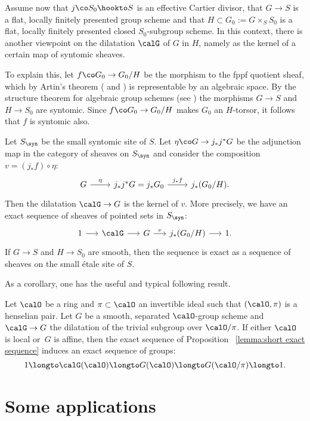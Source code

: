 \documentclass[10pt]{alggeom}
\theoremstyle{definition}
\numberwithin{equation}{section}
\begin{document}
Assume now that $j\co S_0\hookto S$ is an effective Cartier divisor,
that $G\to S$ is a flat, locally finitely presented group scheme
and that $H\subset G_0:=G\times_SS_0$ is a flat, locally finitely
presented closed
$S_0$-subgroup scheme. In this context, there is another
viewpoint on the dilatation $\calG$ of $G$ in $H$, namely as the
kernel of a certain map of syntomic sheaves.

To explain this, let $f\co G_0\to G_0/H$ be the morphism to
the fppf quotient sheaf, which by Artin's theorem
(\cite[Cor.~6.3]{Ar74} and
\cite[\href{https://stacks.math.columbia.edu/tag/04S6}{04S6}]{stacks-project})
is representable by an algebraic
space. By the structure theorem for algebraic group schemes
(see \cite[Exp.~VII$_{\on{B}}$, Cor.~5.5.1]{SGA3})
the morphisms $G\to S$ and $H\to S_0$ are syntomic. Since
$f\co G_0\to G_0/H$ makes $G_0$ an $H$-torsor, it follows
that $f$ is syntomic also.

 \label{lemma:short exact sequence}
Let $S_{\syn}$ be the small syntomic site of $S$. Let
$\eta\co G\to j_*j^*G$ be the adjunction map in the category
of sheaves on $S_{\syn}$ and consider the composition
$v=(j_*f)\circ \eta$:
\[
\begin{tikzcd}
G \ar[r,"\eta"] & j_*j^*G=j_*G_0 \ar[r,"j_*f"] & j_*(G_0/H).
\end{tikzcd}
\]
Then the dilatation $\calG\to G$ is the kernel of $v$.
More precisely, we have an exact sequence of sheaves of
pointed sets in $S_{\syn}$:
\[
\begin{tikzcd}[column sep=15]
1 \ar[r] & \calG \ar[r] & G \ar[r,"v"] & j_*(G_0/H) \ar[r] & 1.
\end{tikzcd}
\]
If $G\to S$ and $H\to S_0$ are smooth, then the sequence is
exact as a sequence of sheaves on the small \'etale site of $S$.
\xprop

As a corollary, one has the useful and typical following result.

\coro \cite{MRR20} \label{lemma:congruence}
Let $\calO$ be a ring and $\pi\subset \calO$ an invertible ideal
such that $(\calO,\pi)$ is a henselian pair. Let $G$ be a smooth,
separated $\calO$-group scheme and $\calG\to G$ the
dilatation of the trivial subgroup over $\calO/\pi$. If either
$\calO$ is local or~$G$ is affine, then the exact sequence of
Proposition ~\ref{lemma:short exact sequence}
induces an exact sequence of groups:
\[
1\longto \calG(\calO) \longto G(\calO) \longto G(\calO/\pi) \longto 1.
\]
\xcoro
 
 
 \part{Some applications }
\end{document}
